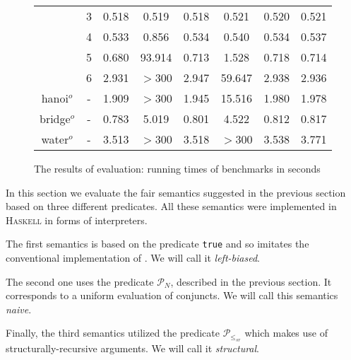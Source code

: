 \begin{figure*}
\begin{tabular}{ c | c | c | c | c | c | c | c }
                 & 3    & 0.518 &  0.519 & 0.518 & 0.521  & 0.520 & 0.521 \\
                 & 4    & 0.533 &  0.856 & 0.534 & 0.540  & 0.534 & 0.537 \\
                 & 5    & 0.680 & 93.914 & 0.713 & 1.528  & 0.718 & 0.714 \\
                 & 6    & 2.931 & $>$300 & 2.947 & 59.647 & 2.938 & 2.936 \\
    \hline
    hanoi$^o$    & -    & 1.909 & $>$300 & 1.945 & 15.516 & 1.980 & 1.978 \\
    \hline
    bridge$^o$   & -    & 0.783 & 5.019  & 0.801 & 4.522  & 0.812 & 0.817 \\
    \hline
    water$^o$    & -    & 3.513 & $>$300 & 3.518 & $>$300 & 3.538 & 3.771

  \end{tabular}
  \caption{The results of evaluation: running times of benchmarks in seconds}
  \label{fair:evaluation-table}
\end{figure*}

In this section we evaluate the fair semantics suggested in the previous section based on three different predicates.
All these semantics were implemented in \textsc{Haskell} in forms of interpreters.

The first semantics is based on the predicate \lstinline|true| and so imitates the conventional implementation of \mk. We will call it \emph{left-biased}.

The second one uses the predicate $\mathcal{P}_N$, described in the previous section. It corresponds to a uniform evaluation of conjuncts. We will call this semantics \emph{naive}.

Finally, the third semantics utilized the predicate $\mathcal{P}_{\leq_{sr}}$ which makes use of structurally-recursive arguments. We will call it \emph{structural}.


